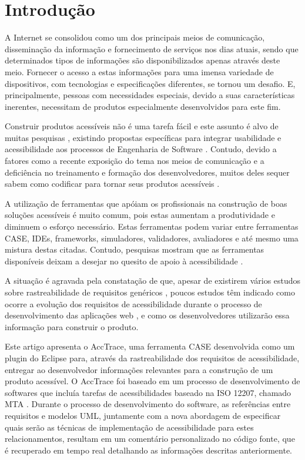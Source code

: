 \documentclass[runningheads,a4paper]{llncs}
\begin{document}
\section{Introdução}

A Internet se consolidou como um dos principais meios de comunicação, disseminação da informação e fornecimento de serviços nos dias atuais, sendo que determinados tipos de informações são disponibilizados apenas através deste meio. Fornecer o acesso a estas informações para uma imensa variedade de dispositivos, com tecnologias e especificações diferentes, se tornou um desafio. E, principalmente, pessoas com necessidades especiais, devido a suas características inerentes, necessitam de produtos especialmente desenvolvidos para este fim.

Construir produtos acessíveis não é uma tarefa fácil e este assunto é alvo de muitas pesquisas \cite{lazar:04,brajnik:06,zeng:05}, existindo propostas específicas para integrar usabilidade e acessibilidade aos processos de Engenharia de Software \cite{springerlink:10.1007/978-3-642-02713-0,maia:10}. Contudo, devido a fatores como a recente exposição do tema nos meios de comunicação e a deficiência no treinamento e formação  dos desenvolvedores, muitos deles sequer sabem como codificar para tornar seus produtos acessíveis \cite{1630123,alves:11}.

A utilização de ferramentas que apóiam os profissionais na construção de boas soluções acessíveis é muito comum, pois estas aumentam a produtividade e diminuem o esforço necessário. Estas ferramentas podem variar entre ferramentas CASE, IDEs, frameworks, simuladores, validadores, avaliadores e até mesmo uma mistura destas citadas. Contudo, pesquisas mostram que as ferramentas disponíveis deixam a desejar no quesito de apoio à acessibilidade \cite{Trewin:2010:ACT:1805986.1806029}.

A situação é agravada pela constatação de que, apesar de existirem vários estudos sobre rastreabilidade de requisitos genéricos \cite{5970169,292398,5485417,6405269}, poucos estudos têm indicado como ocorre a evolução dos requisitos de acessibilidade durante o processo de desenvolvimento das aplicações web \cite{analuizadias:2010}, e como os desenvolvedores utilizarão essa informação para construir o produto.

Este artigo apresenta o AccTrace, uma ferramenta CASE desenvolvida como um
plugin do Eclipse para, através da rastreabilidade dos requisitos de
acessibilidade, entregar ao desenvolvedor informações relevantes para a
construção de um produto acessível. O AccTrace foi baseado em um processo de
desenvolvimento de softwares que incluía tarefas de acessibilidades baseado na
ISO 12207, chamado MTA \cite{maia:10}. Durante o processo de desenvolvimento do
software, as referências entre requisitos e modelos UML, juntamente com a nova
abordagem de especificar quais serão as técnicas de implementação de
acessibilidade para estes relacionamentos, resultam em um comentário
personalizado no código fonte, que é recuperado em tempo real detalhando as
informações descritas anteriormente.
\end{document}
